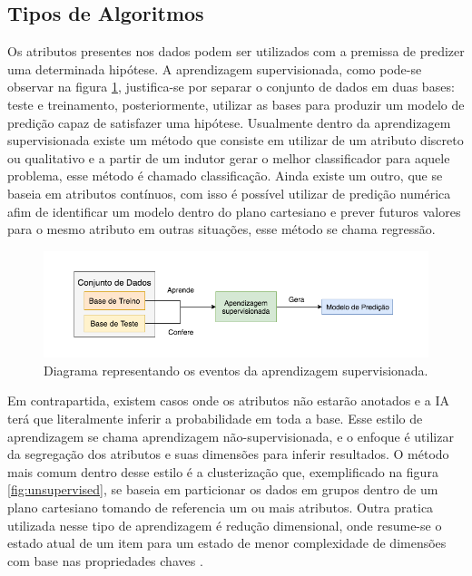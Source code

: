 \subsection{Tipos de Algoritmos}
Os atributos presentes nos dados podem ser utilizados com a premissa de predizer uma determinada hipótese. A aprendizagem supervisionada, como pode-se observar na figura \ref{fig:supervisedlearning}, justifica-se por separar o conjunto de dados em duas bases: teste e treinamento, posteriormente, utilizar as bases para produzir um modelo de predição capaz de satisfazer uma hipótese. Usualmente dentro da aprendizagem supervisionada existe um método que consiste em utilizar de um atributo discreto ou qualitativo e a partir de um indutor gerar o melhor classificador para aquele problema, esse método é chamado classificação. Ainda existe um outro, que se baseia em atributos contínuos, com isso é possível utilizar de predição numérica afim de identificar um modelo dentro do plano cartesiano e prever futuros valores para o mesmo atributo em outras situações, esse método se chama regressão. \cite{hastie2009unsupervised, russell2003artificial}

\begin{figure}[H]
    \centering
    \includegraphics[width=.8\textwidth]{imagens/supervisedlearning.png}
    \caption{Diagrama representando os eventos da aprendizagem supervisionada.}
    \label{fig:supervisedlearning}
\end{figure}

Em contrapartida, existem casos onde os atributos não estarão anotados e a IA terá que literalmente inferir a probabilidade em toda a base. Esse estilo de aprendizagem se chama aprendizagem não-supervisionada, e o enfoque é utilizar da segregação dos atributos e suas dimensões para inferir resultados. O método mais comum dentro desse estilo é a clusterização que, exemplificado na figura \ref{fig:unsupervised}, se baseia em particionar os dados em grupos dentro de um plano cartesiano tomando de referencia um ou mais atributos. Outra pratica utilizada nesse tipo de aprendizagem é redução dimensional, onde resume-se o estado atual de um item para um estado de menor complexidade de dimensões com base nas propriedades chaves \cite{hastie2009unsupervised, mohri2012foundations}.

